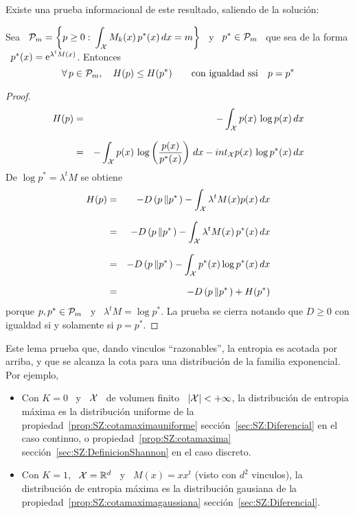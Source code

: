 Existe una prueba informacional de este resultado, saliendo de la soluci\'on:
%
\begin{lema}
  Sea \ $\displaystyle \P_m = \left\{ p \ge 0: \: \int_\X M_k(x) \, p^*(x) \, dx
    =  m \right\}$ \  y \  $p^* \in  \P_m$ \  que sea  de la  forma \  $p^*(x) =
  \e^{\lambda^t M(x)}$. Entonces
  \[
  \forall \,  p \in \P_m, \quad  H(p) \le H(p^*) \qquad  \mbox{con igualdad ssi}
  \quad p = p^*
  \]
\end{lema}
\begin{proof}
\begin{eqnarray*}
H(p) & = & - \int_\X p(x) \, \log p(x) \, dx\\[2.5mm]
%
& = & - \int_\X p(x) \, \log\left( \frac{p(x)}{p^*(x)} \right) \, dx - int_\X
p(x) \, \log p^*(x) \, dx
\end{eqnarray*}
%
De $\log p^* = \lambda^t M$ se obtiene
%
\begin{eqnarray*}
H(p) & = & - D\left( p \left\| p^* \right. \right) - \int_\X \lambda^t M(x) p(x)
\, dx\\[2.5mm]
%
& = & - D\left( p \left\| p^* \right. \right) - \int_\X \lambda^t M(x) \, p^*(x)
\, dx\\[2.5mm]
%
& = & - D\left( p \left\| p^* \right. \right) - \int_\X p^*(x) \log p^*(x) \,
dx\\[2.5mm]
%
& = & - D\left( p \left\| p^* \right. \right) + H(p^*)
\end{eqnarray*}
%
porque $p,  p^* \in \P_m$ \  y \ $\lambda^t M  = \log p^*$. La  prueba se cierra
notando que $D \ge 0$ con igualdad si y solamente si $p = p^*$.
\end{proof}
%
Este lema prueba que, dando  vinculos ``razonables'', la entropia es acotada por
arriba,  y  que  se alcanza  la  cota  para  una  distribuci\'on de  la  familia
exponencial. Por ejemplo,
%
\begin{itemize}
\item Con  $K =  0$ \  y \  $\X$ \ de  volumen finito  \ $|\X|  < +  \infty$, la
  distribuci\'on  de  entropia m\'axima  es  la  distribuci\'on  uniforme de  la
  propiedad~\ref{prop:SZ:cotamaximauniforme}   secci\'on~\ref{sec:SZ:Diferencial}
  en     el      caso     continuo,     o     propiedad~\ref{prop:SZ:cotamaxima}
  secci\'on~\ref{sec:SZ:DefinicionShannon} en el caso discreto.
%
\item Con  $K =  1$, \ $\X  = \Rset^d$  \ y \  $M(x) = x  x^t$ (visto  con $d^2$
  vinculos),  la  distribuci\'on  de  entropia  m\'axima  es  la  distribuci\'on
  gausiana        de        la       propiedad~\ref{prop:SZ:cotamaximagaussiana}
  secci\'on~\ref{sec:SZ:Diferencial}.
\end{itemize}



